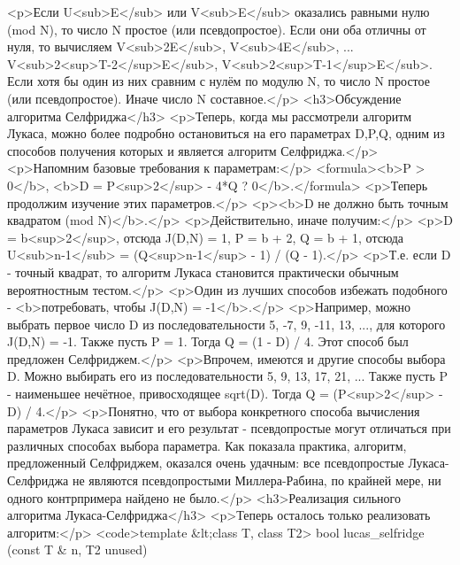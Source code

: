 <p>Если U<sub>E</sub> или V<sub>E</sub> оказались равными нулю (mod N), то число N простое (или псевдопростое). Если они оба отличны от нуля, то вычисляем V<sub>2E</sub>, V<sub>4E</sub>, ... V<sub>2<sup>T-2</sup>E</sub>, V<sub>2<sup>T-1</sup>E</sub>. Если хотя бы один из них сравним с нулём по модулю N, то число N простое (или псевдопростое). Иначе число N составное.</p>
<h3>Обсуждение алгоритма Селфриджа</h3>
<p>Теперь, когда мы рассмотрели алгоритм Лукаса, можно более подробно остановиться на его параметрах D,P,Q, одним из способов получения которых и является алгоритм Селфриджа.</p>
<p>Напомним базовые требования к параметрам:</p>
<formula><b>P > 0</b>,
<b>D = P<sup>2</sup> - 4*Q ? 0</b>.</formula>
<p>Теперь продолжим изучение этих параметров.</p>
<p><b>D не должно быть точным квадратом (mod N)</b>.</p>
<p>Действительно, иначе получим:</p>
<p>D = b<sup>2</sup>, отсюда J(D,N) = 1, P = b + 2, Q = b + 1, отсюда U<sub>n-1</sub> = (Q<sup>n-1</sup> - 1) / (Q - 1).</p>
<p>Т.е. если D - точный квадрат, то алгоритм Лукаса становится практически обычным вероятностным тестом.</p>
<p>Один из лучших способов избежать подобного - <b>потребовать, чтобы J(D,N) = -1</b>.</p>
<p>Например, можно выбрать первое число D из последовательности 5, -7, 9, -11, 13, ..., для которого J(D,N) = -1. Также пусть P = 1. Тогда Q = (1 - D) / 4. Этот способ был предложен Селфриджем.</p>
<p>Впрочем, имеются и другие способы выбора D. Можно выбирать его из последовательности 5, 9, 13, 17, 21, ... Также пусть P - наименьшее нечётное, привосходящее sqrt(D). Тогда Q = (P<sup>2</sup> - D) / 4.</p>
<p>Понятно, что от выбора конкретного способа вычисления параметров Лукаса зависит и его результат - псевдопростые могут отличаться при различных способах выбора параметра. Как показала практика, алгоритм, предложенный Селфриджем, оказался очень удачным: все псевдопростые Лукаса-Селфриджа не являются псевдопростыми Миллера-Рабина, по крайней мере, ни одного контрпримера найдено не было.</p>
<h3>Реализация сильного алгоритма Лукаса-Селфриджа</h3>
<p>Теперь осталось только реализовать алгоритм:</p>
<code>template &lt;class T, class T2>
bool lucas_selfridge (const T & n, T2 unused)
